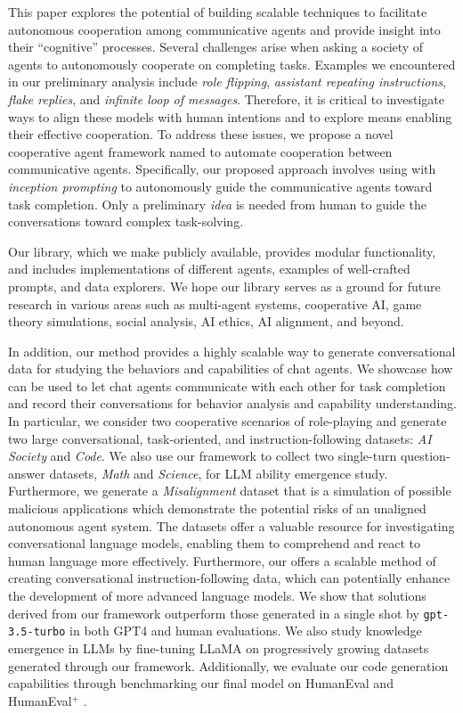 This paper explores the potential of building scalable techniques to facilitate autonomous cooperation among communicative agents and provide insight into their ``cognitive'' processes. Several challenges arise when asking a society of agents to autonomously cooperate on completing tasks. Examples we encountered in our preliminary analysis include \textit{role flipping}, \textit{assistant repeating instructions}, \textit{flake replies}, and \textit{infinite loop of messages}.
Therefore, it is critical to investigate ways to align these models with human intentions and to explore means enabling their effective cooperation.
To address these issues, we propose a novel cooperative agent framework named \RP to automate cooperation between communicative agents. Specifically, our proposed approach involves using \RP with \textit{inception prompting} to autonomously guide the communicative agents toward task completion. 
Only a preliminary \textit{idea} is needed from human 
to guide the conversations toward complex task-solving.

Our library, which we make publicly available, provides modular functionality, and includes implementations of different agents, examples of well-crafted prompts, and data explorers.
We hope our library serves as a ground for future research in various areas such as multi-agent systems, cooperative AI, game theory simulations, social analysis, AI ethics, AI alignment, and beyond.

In addition, our \RP method provides a highly scalable way to generate conversational data for studying the behaviors and capabilities of chat agents. We showcase how \RP can be used to let chat agents communicate with each other for task completion and record their conversations for behavior analysis and capability understanding. 
In particular, we consider two cooperative scenarios of role-playing and generate two large conversational, task-oriented, and instruction-following datasets: \textit{AI Society} and \textit{Code}. We also use our framework to collect two single-turn question-answer datasets, \textit{Math} and \textit{Science}, for LLM ability emergence study. Furthermore, we generate a \textit{Misalignment} dataset that is a simulation of possible malicious applications which demonstrate the potential risks of an unaligned autonomous agent system. 
The datasets offer a valuable resource for investigating conversational language models, enabling them to comprehend and react to human language more effectively. Furthermore, our \RP offers a scalable method of creating conversational instruction-following data, which can potentially enhance the development of more advanced 
language models. We show that solutions derived from our \RP framework outperform those generated in a single shot by \texttt{gpt-3.5-turbo} \cite{openai_chatgpt} in both GPT4 and human evaluations. We also study knowledge emergence in LLMs by fine-tuning LLaMA \cite{touvron2023llama} on progressively growing datasets generated through our framework. Additionally, we evaluate our code generation capabilities through benchmarking our final model on HumanEval \cite{chen2021evaluating} and HumanEval$^{+}$ \cite{evalplus}. 


